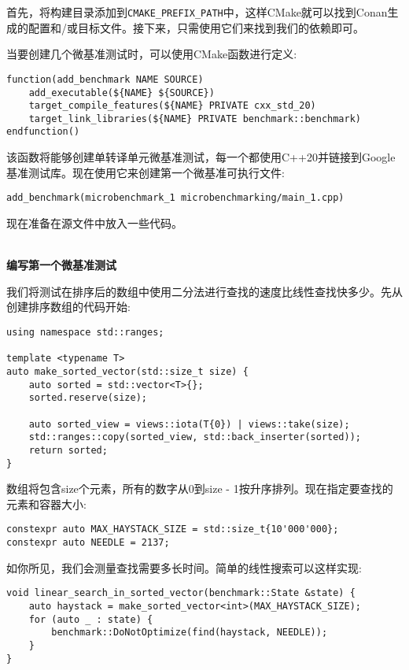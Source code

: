 首先，将构建目录添加到\texttt{CMAKE\_PREFIX\_PATH}中，这样CMake就可以找到Conan生成的配置和/或目标文件。接下来，只需使用它们来找到我们的依赖即可。

当要创建几个微基准测试时，可以使用CMake函数进行定义:

\begin{lstlisting}[style=styleCMake]
function(add_benchmark NAME SOURCE)
	add_executable(${NAME} ${SOURCE})
	target_compile_features(${NAME} PRIVATE cxx_std_20)
	target_link_libraries(${NAME} PRIVATE benchmark::benchmark)
endfunction()
\end{lstlisting}

该函数将能够创建单转译单元微基准测试，每一个都使用C++20并链接到Google基准测试库。现在使用它来创建第一个微基准可执行文件:

\begin{lstlisting}[style=styleCMake]
add_benchmark(microbenchmark_1 microbenchmarking/main_1.cpp)
\end{lstlisting}

现在准备在源文件中放入一些代码。

\hspace*{\fill} \\ %
\noindent
\textbf{编写第一个微基准测试}

我们将测试在排序后的数组中使用二分法进行查找的速度比线性查找快多少。先从创建排序数组的代码开始:

\begin{lstlisting}[style=styleCXX]
using namespace std::ranges;

template <typename T>
auto make_sorted_vector(std::size_t size) {
	auto sorted = std::vector<T>{};
	sorted.reserve(size);
	
	auto sorted_view = views::iota(T{0}) | views::take(size);
	std::ranges::copy(sorted_view, std::back_inserter(sorted));
	return sorted;
}
\end{lstlisting}

数组将包含size个元素，所有的数字从0到size - 1按升序排列。现在指定要查找的元素和容器大小:

\begin{lstlisting}[style=styleCXX]
constexpr auto MAX_HAYSTACK_SIZE = std::size_t{10'000'000};
constexpr auto NEEDLE = 2137;
\end{lstlisting}

如你所见，我们会测量查找需要多长时间。简单的线性搜索可以这样实现:

\begin{lstlisting}[style=styleCXX]
void linear_search_in_sorted_vector(benchmark::State &state) {
	auto haystack = make_sorted_vector<int>(MAX_HAYSTACK_SIZE);
	for (auto _ : state) {
		benchmark::DoNotOptimize(find(haystack, NEEDLE));
	}
}
\end{lstlisting}

